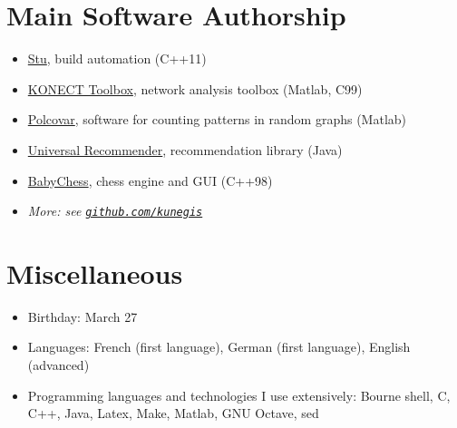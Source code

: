 \documentclass[line,margin]{res}
\begin{document}
\begin{resume}
\section{Main Software Authorship}
\begin{itemize}
  \item \href{https://github.com/kunegis/stu}{Stu}, build automation (C++11)
  \item \href{https://github.com/kunegis/konect-toolbox}{KONECT Toolbox}, network analysis toolbox (Matlab, C99)
  \item \href{https://west.uni-koblenz.de/Research/systems/polcovar}{Polcovar}, software for counting patterns in random graphs (Matlab)
  \item \href{https://github.com/kunegis/universal-recommender}{Universal Recommender}, recommendation library (Java)
  \item \href{https://github.com/kunegis/babychess}{BabyChess}, chess engine and GUI (C++98)
  \item \emph{More:  see {\tt \href{https://github.com/kunegis}{github.com/kunegis}}}
\end{itemize}

\section{Miscellaneous}
\begin{itemize}
  \item Birthday:  March 27
  \item Languages: French (first language), German (first language),
    English (advanced)
  \item Programming languages and technologies I use extensively:
    Bourne shell, C, C++, Java, Latex, Make, Matlab, GNU Octave, sed
\end{itemize}

\end{resume}
\end{document}
